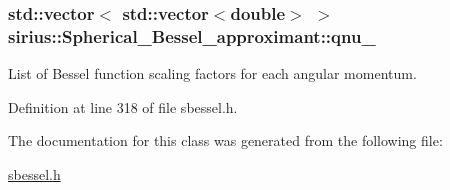 \subsubsection[{qnu\+\_\+}]{\setlength{\rightskip}{0pt plus 5cm}std\+::vector$<$ std\+::vector$<$double$>$ $>$ sirius\+::\+Spherical\+\_\+\+Bessel\+\_\+approximant\+::qnu\+\_\+\hspace{0.3cm}{\ttfamily [private]}}\label{classsirius_1_1_spherical___bessel__approximant_a88c4834eb7bc83ed0a580a8108dc9aaf}


List of Bessel function scaling factors for each angular momentum. 



Definition at line 318 of file sbessel.\+h.



The documentation for this class was generated from the following file\+:\begin{DoxyCompactItemize}
\item 
\hyperlink{sbessel_8h}{sbessel.\+h}\end{DoxyCompactItemize}
